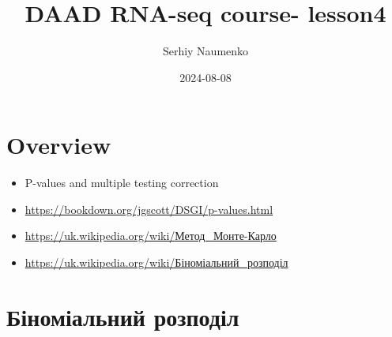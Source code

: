 \documentclass[
  10pt,
]{article}
\title{DAAD RNA-seq course- lesson4}
\author{Serhiy Naumenko}
\date{2024-08-08}
\providecommand{\tightlist}{%
  \setlength{\itemsep}{0pt}\setlength{\parskip}{0pt}}
\begin{document}
\maketitle

{
\hypersetup{linkcolor=}
\setcounter{tocdepth}{2}
\tableofcontents
}
\hypertarget{overview}{%
\section{Overview}\label{overview}}

\begin{itemize}
\tightlist
\item
  P-values and multiple testing correction
\item
  \url{https://bookdown.org/jgscott/DSGI/p-values.html}
\item
  \url{https://uk.wikipedia.org/wiki/Метод_Монте-Карло}
\item
  \url{https://uk.wikipedia.org/wiki/Біноміальний_розподіл}
\end{itemize}

\newpage

\hypertarget{ux431ux456ux43dux43eux43cux456ux430ux43bux44cux43dux438ux439-ux440ux43eux437ux43fux43eux434ux456ux43b}{%
\section{Біноміальний
розподіл}\label{ux431ux456ux43dux43eux43cux456ux430ux43bux44cux43dux438ux439-ux440ux43eux437ux43fux43eux434ux456ux43b}}
\end{document}
